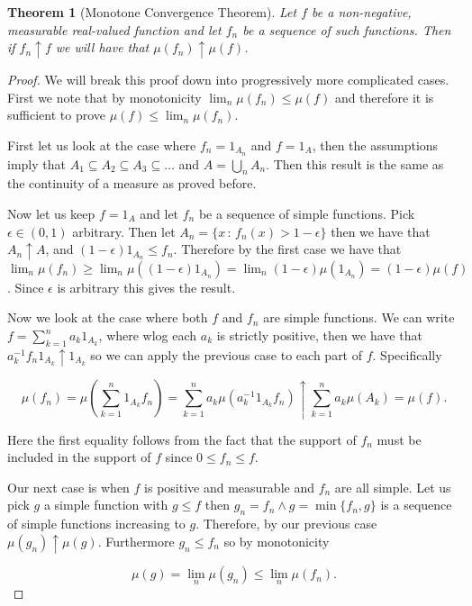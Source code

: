 \documentclass[
]{book}
\newtheorem{theorem}{Theorem}[chapter]
\theoremstyle{definition}
\theoremstyle{definition}
\theoremstyle{definition}
\theoremstyle{definition}
\theoremstyle{remark}
\begin{document}
\begin{theorem}[Monotone Convergence Theorem]
Let \(f\) be a non-negative, measurable real-valued function and let \(f_n\) be a sequence of such functions. Then if \(f_n \uparrow f\) we will have that \(\mu(f_n) \uparrow \mu(f)\).
\end{theorem}

\begin{proof}
We will break this proof down into progressively more complicated cases. First we note that by monotonicity \(\lim_n \mu(f_n) \leq \mu(f)\) and therefore it is sufficient to prove \(\mu(f) \leq \lim_n \mu(f_n)\).

First let us look at the case where \(f_n = 1_{A_n}\) and \(f=1_{A}\), then the assumptions imply that \(A_1 \subseteq A_2 \subseteq A_3 \subseteq \dots\) and \(A= \bigcup_n A_n\). Then this result is the same as the continuity of a measure as proved before.

Now let us keep \(f=1_{A}\) and let \(f_n\) be a sequence of simple functions. Pick \(\epsilon \in (0,1)\) arbitrary. Then let \(A_n = \{ x\,:\, f_n(x)>1-\epsilon\}\) then we have that \(A_n \uparrow A\), and \((1-\epsilon)1_{A_n} \leq f_n\). Therefore by the first case we have that \(\lim_n \mu(f_n) \geq \lim_n \mu((1-\epsilon)1_{A_n}) = \lim_n (1-\epsilon) \mu(1_{A_n}) = (1-\epsilon) \mu(f)\). Since \(\epsilon\) is arbitrary this gives the result.

Now we look at the case where both \(f\) and \(f_n\) are simple functions. We can write \(f = \sum_{k=1}^n a_k 1_{A_k}\), where wlog each \(a_k\) is strictly positive, then we have that \(a_k^{-1} f_n 1_{A_k} \uparrow 1_{A_k}\) so we can apply the previous case to each part of \(f\). Specifically

\[ \mu(f_n) = \mu(\sum_{k=1}^n  1_{A_k}f_n) = \sum_{k=1}^n a_k \mu (a_k^{-1} 1_{A_k}f_n) \uparrow \sum_{k=1}^n a_k \mu(A_k) = \mu(f). \]

Here the first equality follows from the fact that the support of \(f_n\) must be included in the support of \(f\) since \(0 \leq f_n \leq f\).

Our next case is when \(f\) is positive and measurable and \(f_n\) are all simple. Let us pick \(g\) a simple function with \(g \leq f\) then \(g_n = f_n \wedge g = \min\{f_n, g\}\) is a sequence of simple functions increasing to \(g\). Therefore, by our previous case \(\mu(g_n) \uparrow \mu(g)\). Furthermore \(g_n \leq f_n\) so by monotonicity

\[\mu(g) =\lim_n \mu(g_n) \leq \lim_n \mu(f_n).\]


\end{proof}
\end{document}
